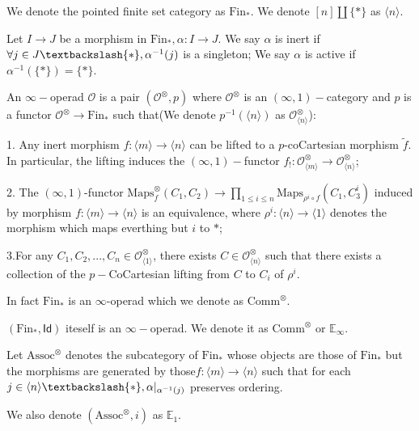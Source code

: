 \begin{definition}
      We denote the pointed finite set category as $\text{Fin}_*$. We denote $[n]\coprod \{*\}$ as $\langle n\rangle$.
\end{definition}

\begin{definition}
    Let $I\to J$ be a morphism in $\text{Fin}_*, \alpha:I\to J$. We say $\alpha$ is inert if $\forall j \in J\textbackslash \{*\}, \alpha^{-1}(j)$ is a singleton; We say $\alpha$ is active if $\alpha^{-1}(\{*\})=\{*\}$.
\end{definition}

\begin{definition}
    An $\infty-$operad $\mathcal{O}$ is a pair $(\mathcal{O}^\otimes,p)$ where $\mathcal{O}^\otimes$ is an $(\infty,1)-$category  and $p$ is a functor $\mathcal{O}^\otimes \to \text{Fin}_*$ such that(We denote $p^{-1}(\langle n\rangle)$ as $\mathcal{O}^\otimes_{\langle n\rangle}$):


    1. Any inert morphism $f: \langle m\rangle \to \langle n\rangle $ can be lifted to a $p$-coCartesian morphism $\tilde{f}$. In particular, the lifting induces the $(\infty,1)-$functor $f_!:\mathcal{O}^\otimes_{\langle m \rangle}\to \mathcal{O}^\otimes_{\langle n \rangle}$;

    2. The $(\infty,1)$-functor $\text{Maps}_f^\otimes(C_1,C_2)\to \prod_{1\leq i \leq n} \text{Maps}_{\rho^i\circ f}(C_1,C_3^i)$ induced by morphism $f: \langle m\rangle \to \langle n\rangle $ is an equivalence, where $\rho^i:\langle n \rangle \to \langle 1\rangle$ denotes the morphism which maps everthing but $i$ to $*$;

    3.For any $C_1,C_2,..., C_n\in \mathcal{O}^\otimes_{\langle 1 \rangle}$, there exists $C \in \mathcal{O}^\otimes_{\langle n \rangle}$ such that there exists a collection of the $p-$CoCartesian lifting from $C$ to $C_i$ of $\rho^i$.
\end{definition}


\begin{remark}
    In fact $\text{Fin}_*$ is an $\infty$-operad which we denote as $\text{Comm}^\otimes$.
\end{remark}

\begin{example}
    $(\text{Fin}_*,\textsf{Id})$ iteself is an $\infty-$operad. We denote it as $\text{Comm}^\otimes$ or $\mathbb{E}_\infty$.
\end{example}

\begin{example}
    Let $\text{Assoc}^\otimes$ denotes the subcategory of $\text{Fin}_*$ whose objects are those of $\text{Fin}_*$ but the morphisms are generated by those$f:\langle m \rangle \to \langle n \rangle$  such that for each $j\in \langle n \rangle \textbackslash \{*\},\alpha|_{\alpha^{-1}(j)}$ preserves ordering. 

    We also denote $(\text{Assoc}^\otimes,i)$ as $\mathbb{E}_1$.
\end{example}

